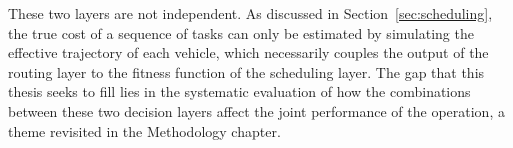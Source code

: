 These two layers are not independent. As discussed in Section~\ref{sec:scheduling}, the true cost of a sequence of tasks can only be estimated by simulating the effective trajectory of each vehicle, which necessarily couples the output of the routing layer to the fitness function of the scheduling layer. The gap that this thesis seeks to fill lies in the systematic evaluation of how the combinations between these two decision layers affect the joint performance of the operation, a theme revisited in the Methodology chapter.
